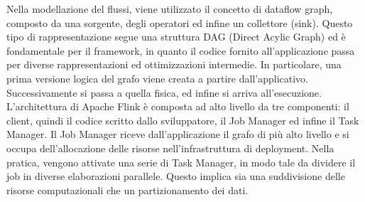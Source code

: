 


Nella modellazione del flussi, viene utilizzato il concetto di dataflow graph, composto da una sorgente, degli operatori ed infine un collettore (sink). Questo tipo di rappresentazione segue una struttura DAG (Direct Acylic Graph) ed è fondamentale per il framework, in quanto il codice fornito all'applicazione passa per diverse rappresentazioni ed ottimizzazioni intermedie. In particolare, una prima versione logica del grafo viene creata a partire dall'applicativo. Successivamente si passa a quella fisica, ed infine si arriva all'esecuzione. L'architettura di Apache Flink è composta ad alto livello da tre componenti: il client, quindi il codice scritto dallo sviluppatore, il Job Manager ed infine il Task Manager.  Il Job Manager riceve dall'applicazione il grafo di più alto livello e si occupa dell'allocazione delle risorse nell'infrastruttura di deployment. Nella pratica, vengono attivate una serie di Task Manager, in modo tale da dividere il job in diverse elaborazioni parallele. Questo implica sia una suddivisione delle risorse computazionali che un partizionamento dei dati. 

